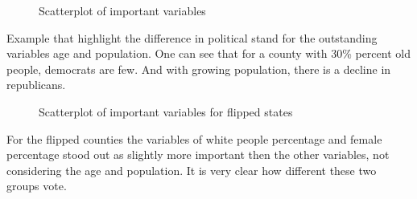 \begin{figure}[H]
\centering
{}
\hfill
{}
\caption{Scatterplot of important variables}
\end{figure}

Example that highlight the difference in political stand for the outstanding variables age and population. One can see that for a county with 30\% percent old people, democrats are few. And with growing population, there is a decline in republicans.

\begin{figure}[H]
\centering
{}
\hfill
{}
\caption{Scatterplot of important variables for flipped states}
\end{figure}
For the flipped counties the variables of white people percentage and female percentage stood out as slightly more important then the other variables, not considering the age and population. It is very clear how different these two groups vote.